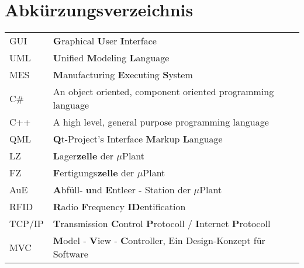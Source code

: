 \chapter*{Abkürzungsverzeichnis}

\begin{center}
	
	\renewcommand{\arraystretch}{1.1}
	
	\begin{supertabular}{p{2.1cm}p{10.9cm}}
		GUI				& \textbf{G}raphical \textbf{U}ser \textbf{I}nterface \\
		UML				& \textbf{U}nified \textbf{M}odeling \textbf{L}anguage \\
		MES				& \textbf{M}anufacturing \textbf{E}xecuting \textbf{S}ystem\\
		C\#				& An object oriented, component oriented programming language\\
		C++				& A high level, general purpose programming language\\
		QML				& \textbf{Q}t-Project's Interface \textbf{M}arkup \textbf{L}anguage\\
		LZ				& \textbf{L}ager\textbf{zelle} der $\mu$Plant\\
		FZ				& \textbf{F}ertigungs\textbf{zelle} der $\mu$Plant \\
		AuE				& \textbf{A}bfüll- \textbf{u}nd \textbf{E}ntleer - Station der $\mu$Plant \\
		RFID			& \textbf{R}adio \textbf{F}requency \textbf{ID}entification\\
		TCP/IP			& \textbf{T}ransmission \textbf{C}ontrol \textbf{P}rotocoll / \textbf{I}nternet \textbf{P}rotocoll\\
		MVC				& \textbf{M}odel - \textbf{V}iew - \textbf{C}ontroller, Ein Design-Konzept für Software\\
	\end{supertabular}

\end{center}